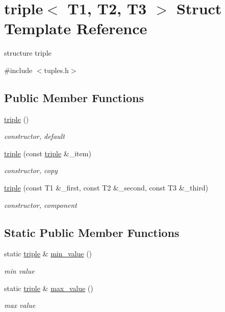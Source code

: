 \hypertarget{structtriple}{}\section{triple$<$ T1, T2, T3 $>$ Struct Template Reference}
\label{structtriple}


structure triple  




{\ttfamily \#include $<$tuples.\+h$>$}

\subsection*{Public Member Functions}
\begin{DoxyCompactItemize}
\item 
\hyperlink{structtriple_a3bdf8136df773fff422b4cbb354cf749}{triple} ()
\begin{DoxyCompactList}\small\item\em constructor, default \end{DoxyCompactList}\item 
\hyperlink{structtriple_a88688d689a93bf4b8a25bc29728a53b5}{triple} (const \hyperlink{structtriple}{triple} \&\+\_\+item)
\begin{DoxyCompactList}\small\item\em constructor, copy \end{DoxyCompactList}\item 
\hyperlink{structtriple_ac34fdb8619fdc11fb442e2058d35d840}{triple} (const T1 \&\+\_\+first, const T2 \&\+\_\+second, const T3 \&\+\_\+third)
\begin{DoxyCompactList}\small\item\em constructor, component \end{DoxyCompactList}\end{DoxyCompactItemize}
\subsection*{Static Public Member Functions}
\begin{DoxyCompactItemize}
\item 
static \hyperlink{structtriple}{triple} \& \hyperlink{structtriple_a91d8338063226b63eea74e56377a162b}{min\+\_\+value} ()
\begin{DoxyCompactList}\small\item\em min value \end{DoxyCompactList}\item 
static \hyperlink{structtriple}{triple} \& \hyperlink{structtriple_a73d954bee19bf6493205e794a6448e8f}{max\+\_\+value} ()
\begin{DoxyCompactList}\small\item\em max value \end{DoxyCompactList}\end{DoxyCompactItemize}
